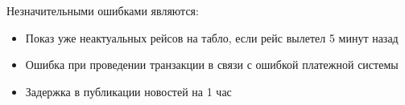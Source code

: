Незначительными ошибками являются:
\begin{itemize}
      \item Показ уже неактуальных рейсов на табло,
            если рейс вылетел 5 минут назад
      \item Ошибка при проведении транзакции в связи
            с ошибкой платежной системы
      \item Задержка в публикации новостей на 1 час
\end{itemize}

